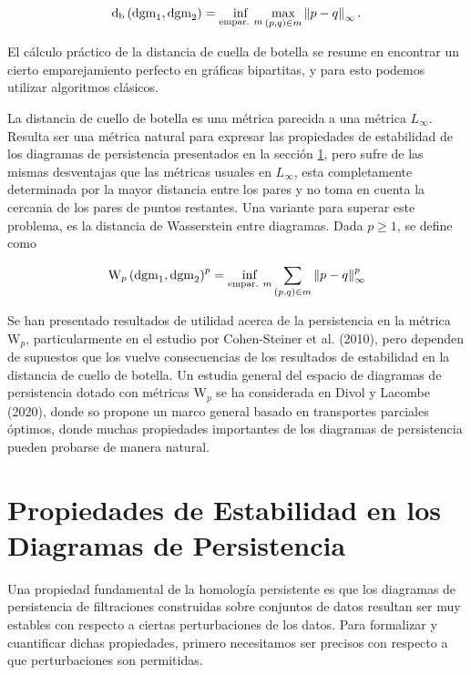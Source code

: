 \begin{equation*}
    \mathrm{d}_{\mathrm{b}}\left(\mathrm{dgm}_{1},\mathrm{dgm}_{2}\right) =
    \inf_{\text{empar. }m}\max_{\left(p,q\right)\in m}\left\|p-q\right\|_{\infty}.
\end{equation*}

El c\'alculo pr\'actico de la distancia de cuella de botella se resume en
encontrar un cierto emparejamiento perfecto en gr\'aficas bipartitas, y para esto
podemos utilizar algoritmos cl\'asicos.

La distancia de cuello de botella es una m\'etrica parecida a una m\'etrica $\mathit{L}_{\infty}$.
Resulta ser una m\'etrica natural para expresar las propiedades de estabilidad de los
diagramas de persistencia presentados en la secci\'on \ref{sec: 4.7},
pero sufre de las mismas desventajas que las m\'etricas usuales en $\mathit{L}_{\infty}$,
esta completamente determinada por la mayor distancia entre los pares
y no toma en cuenta la cercania de los pares de puntos restantes.
Una variante para superar este problema, es la distancia de Wasserstein entre diagramas.
Dada $p\geq 1$, se define como

\begin{equation*}
    \mathrm{W}_{p}\left(\mathrm{dgm}_{1},\mathrm{dgm}_{2}\right)^{p} =
    \inf_{\text{empar. }m}\sum_{\left(p,q\right)\in m}\left\|p-q\right\|_{\infty}^{p}
\end{equation*}

Se han presentado resultados de utilidad acerca de la persistencia en la m\'etrica $\mathrm{W}_{p}$,
particularmente en el estudio por Cohen-Steiner et al. (2010)\cite{Cohen2010},
pero dependen de supuestos que los vuelve consecuencias de los resultados de estabilidad
en la distancia de cuello de botella.
Un estudia general del espacio de diagramas de persistencia dotado con m\'etricas
$\mathrm{W}_{p}$ se ha considerada en Divol y Lacombe (2020)\cite{Divol2021},
donde so propone un marco general basado en transportes parciales \'optimos,
donde muchas propiedades importantes de los diagramas de persistencia pueden probarse de manera natural.

\section{Propiedades de Estabilidad en los Diagramas de Persistencia}\label{sec: 4.7}

Una propiedad fundamental de la homolog\'ia persistente es que
los diagramas de persistencia de filtraciones construidas sobre conjuntos de datos
resultan ser muy estables con respecto a ciertas perturbaciones de los datos.
Para formalizar y cuantificar dichas propiedades, primero necesitamos ser precisos
con respecto a que perturbaciones son permitidas.

